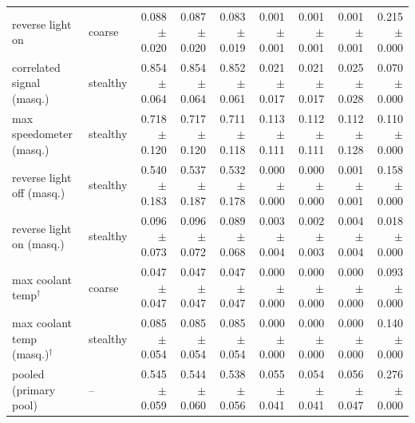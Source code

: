 \begin{table}[t]
\begin{tabular}{@{}llrrrrrrr@{}}
reverse light on & coarse & 0.088 $\pm$ 0.020 & 0.087 $\pm$ 0.020 & 0.083 $\pm$ 0.019 & 0.001 $\pm$ 0.001 & 0.001 $\pm$ 0.001 & 0.001 $\pm$ 0.001 & 0.215 $\pm$ 0.000 \\
correlated signal (masq.) & stealthy & 0.854 $\pm$ 0.064 & 0.854 $\pm$ 0.064 & 0.852 $\pm$ 0.061 & 0.021 $\pm$ 0.017 & 0.021 $\pm$ 0.017 & 0.025 $\pm$ 0.028 & 0.070 $\pm$ 0.000 \\
max speedometer (masq.) & stealthy & 0.718 $\pm$ 0.120 & 0.717 $\pm$ 0.120 & 0.711 $\pm$ 0.118 & 0.113 $\pm$ 0.111 & 0.112 $\pm$ 0.111 & 0.112 $\pm$ 0.128 & 0.110 $\pm$ 0.000 \\
reverse light off (masq.) & stealthy & 0.540 $\pm$ 0.183 & 0.537 $\pm$ 0.187 & 0.532 $\pm$ 0.178 & 0.000 $\pm$ 0.000 & 0.000 $\pm$ 0.000 & 0.001 $\pm$ 0.001 & 0.158 $\pm$ 0.000 \\
reverse light on (masq.) & stealthy & 0.096 $\pm$ 0.073 & 0.096 $\pm$ 0.072 & 0.089 $\pm$ 0.068 & 0.003 $\pm$ 0.004 & 0.002 $\pm$ 0.003 & 0.004 $\pm$ 0.004 & 0.018 $\pm$ 0.000 \\
max coolant temp$^\dagger$ & coarse & 0.047 $\pm$ 0.047 & 0.047 $\pm$ 0.047 & 0.047 $\pm$ 0.047 & 0.000 $\pm$ 0.000 & 0.000 $\pm$ 0.000 & 0.000 $\pm$ 0.000 & 0.093 $\pm$ 0.000 \\
max coolant temp (masq.)$^\dagger$ & stealthy & 0.085 $\pm$ 0.054 & 0.085 $\pm$ 0.054 & 0.085 $\pm$ 0.054 & 0.000 $\pm$ 0.000 & 0.000 $\pm$ 0.000 & 0.000 $\pm$ 0.000 & 0.140 $\pm$ 0.000 \\
pooled (primary pool) & -- & 0.545 $\pm$ 0.059 & 0.544 $\pm$ 0.060 & 0.538 $\pm$ 0.056 & 0.055 $\pm$ 0.041 & 0.054 $\pm$ 0.041 & 0.056 $\pm$ 0.047 & 0.276 $\pm$ 0.000 \\
\bottomrule
\end{tabular}
\end{table}
